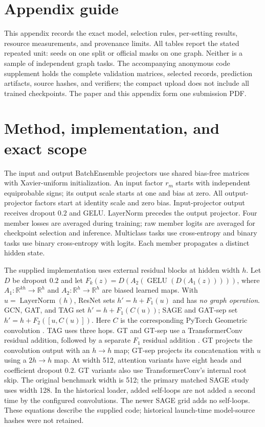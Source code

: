 \section*{Appendix guide}
This appendix records the exact model, selection rules, per-setting results,
resource measurements, and provenance limits. All tables report the stated
repeated unit: seeds on one split or official masks on one graph. Neither is a
sample of independent graph tasks. The accompanying anonymous code supplement
holds the complete validation matrices, selected records, prediction
artifacts, source hashes, and verifiers; the compact upload does not include
all trained checkpoints. The paper and this appendix form one submission PDF.

\section{Method, implementation, and exact scope}\label{app:implementation}
The input and output BatchEnsemble projectors use shared bias-free matrices
with Xavier-uniform initialization. An input factor $r_m$ starts with
independent equiprobable signs; its output scale starts at one and bias at
zero. All output-projector factors start at identity scale and zero bias.
Input-projector output receives dropout $0.2$ and GELU. LayerNorm precedes
the output projector. Four member losses are averaged during training;
raw member logits are averaged for checkpoint selection and inference.
Multiclass tasks use cross-entropy and binary tasks use binary
cross-entropy with logits. Each member propagates a distinct hidden state.

The supplied implementation uses external residual blocks at hidden width
$h$. Let $D$ be dropout $0.2$ and let $F_k(z)=D(A_2(\operatorname{GELU}(D(A_1(z)))))$,
where $A_1:\mathbb R^{kh}\to\mathbb R^h$ and
$A_2:\mathbb R^h\to\mathbb R^h$ are biased learned maps. With
$u=\operatorname{LayerNorm}(h)$, ResNet sets $h'=h+F_1(u)$ and has
\emph{no graph operation}. GCN, GAT, and TAG set
$h'=h+F_1(C(u))$; SAGE and GAT-sep set
$h'=h+F_2([u,C(u)])$. Here $C$ is the corresponding PyTorch Geometric
convolution \citep{kipf2017semi,hamilton2017inductive,velickovic2018graph,du2017topology,brody2022how,fey2019pyg}.
TAG uses three hops. GT and GT-sep use a TransformerConv residual
addition, followed by a separate $F_1$ residual addition
\citep{shi2021masked}. GT projects the convolution output with an
$h\to h$ map; GT-sep projects its concatenation with $u$ using a
$2h\to h$ map. At width 512, attention variants have eight heads and coefficient dropout
$0.2$. GT variants also use TransformerConv's internal root skip. The original benchmark width is
512; the primary matched SAGE study uses width 128. In the historical loader, added self-loops are not added a second time
by the configured convolutions. The newer SAGE grid adds no self-loops.
These equations describe the supplied code; historical launch-time
model-source hashes were not retained.

